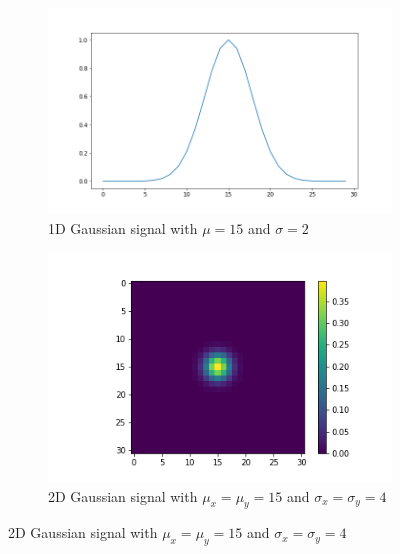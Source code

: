 		\begin{figure}
		    \centering
		    \begin{subfigure}[t]{0.3\textwidth}
		        \includegraphics[width=\textwidth]{graphs/gauss_sigma_4.png}
		        \caption{1D Gaussian signal with $\mu=15$ and $\sigma=2$}
		    \end{subfigure}
		    
		    \begin{subfigure}[t]{0.3\textwidth}
		        \includegraphics[width=\textwidth]{images/gauss_sigma_2.png}
		        \caption{2D Gaussian signal with $\mu_x = \mu_y = 15$ and $\sigma_x = \sigma_y = 4$}
		    \end{subfigure}
		    

\end{figure}
